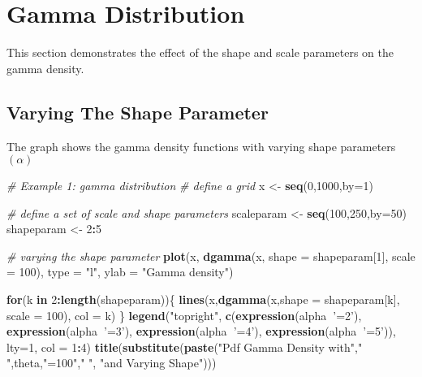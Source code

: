 \documentclass[]{book}
\newenvironment{Shaded}{\begin{snugshade}}{\end{snugshade}}
\newcommand{\KeywordTok}[1]{\textcolor[rgb]{0.13,0.29,0.53}{\textbf{#1}}}
\newcommand{\DataTypeTok}[1]{\textcolor[rgb]{0.13,0.29,0.53}{#1}}
\newcommand{\DecValTok}[1]{\textcolor[rgb]{0.00,0.00,0.81}{#1}}
\newcommand{\StringTok}[1]{\textcolor[rgb]{0.31,0.60,0.02}{#1}}
\newcommand{\CommentTok}[1]{\textcolor[rgb]{0.56,0.35,0.01}{\textit{#1}}}
\newcommand{\ControlFlowTok}[1]{\textcolor[rgb]{0.13,0.29,0.53}{\textbf{#1}}}
\newcommand{\OperatorTok}[1]{\textcolor[rgb]{0.81,0.36,0.00}{\textbf{#1}}}
\newcommand{\NormalTok}[1]{#1}
\theoremstyle{definition}
\theoremstyle{definition}
\theoremstyle{definition}
\theoremstyle{remark}
\begin{document}
\section{Gamma Distribution}\label{gamma-distribution}

This section demonstrates the effect of the shape and scale parameters
on the gamma density.

\subsection{Varying The Shape
Parameter}\label{varying-the-shape-parameter}

The graph shows the gamma density functions with varying shape
parameters \((\alpha)\)

\begin{Shaded}
\begin{Highlighting}[]
\CommentTok{# Example 1: gamma distribution}
\CommentTok{# define a grid}
\NormalTok{x <-}\StringTok{ }\KeywordTok{seq}\NormalTok{(}\DecValTok{0}\NormalTok{,}\DecValTok{1000}\NormalTok{,}\DataTypeTok{by=}\DecValTok{1}\NormalTok{)}

\CommentTok{# define a set of scale and shape parameters}
\NormalTok{scaleparam <-}\StringTok{ }\KeywordTok{seq}\NormalTok{(}\DecValTok{100}\NormalTok{,}\DecValTok{250}\NormalTok{,}\DataTypeTok{by=}\DecValTok{50}\NormalTok{)}
\NormalTok{shapeparam <-}\StringTok{ }\DecValTok{2}\OperatorTok{:}\DecValTok{5}

\CommentTok{# varying the shape parameter}
\KeywordTok{plot}\NormalTok{(x, }\KeywordTok{dgamma}\NormalTok{(x, }\DataTypeTok{shape =}\NormalTok{ shapeparam[}\DecValTok{1}\NormalTok{], }\DataTypeTok{scale =} \DecValTok{100}\NormalTok{), }\DataTypeTok{type =} \StringTok{"l"}\NormalTok{, }\DataTypeTok{ylab =} \StringTok{"Gamma density"}\NormalTok{)}

\ControlFlowTok{for}\NormalTok{(k }\ControlFlowTok{in} \DecValTok{2}\OperatorTok{:}\KeywordTok{length}\NormalTok{(shapeparam))\{}
  \KeywordTok{lines}\NormalTok{(x,}\KeywordTok{dgamma}\NormalTok{(x,}\DataTypeTok{shape =}\NormalTok{ shapeparam[k], }\DataTypeTok{scale =} \DecValTok{100}\NormalTok{), }\DataTypeTok{col =}\NormalTok{ k)}
\NormalTok{\}}
\KeywordTok{legend}\NormalTok{(}\StringTok{"topright"}\NormalTok{, }\KeywordTok{c}\NormalTok{(}\KeywordTok{expression}\NormalTok{(alpha}\OperatorTok{~}\StringTok{'=2'}\NormalTok{), }\KeywordTok{expression}\NormalTok{(alpha}\OperatorTok{~}\StringTok{'=3'}\NormalTok{), }\KeywordTok{expression}\NormalTok{(alpha}\OperatorTok{~}\StringTok{'=4'}\NormalTok{), }\KeywordTok{expression}\NormalTok{(alpha}\OperatorTok{~}\StringTok{'=5'}\NormalTok{)), }\DataTypeTok{lty=}\DecValTok{1}\NormalTok{, }\DataTypeTok{col =} \DecValTok{1}\OperatorTok{:}\DecValTok{4}\NormalTok{)}
\KeywordTok{title}\NormalTok{(}\KeywordTok{substitute}\NormalTok{(}\KeywordTok{paste}\NormalTok{(}\StringTok{"Pdf Gamma Density with"}\NormalTok{,}\StringTok{" "}\NormalTok{,theta,}\StringTok{"=100"}\NormalTok{,}\StringTok{" "}\NormalTok{, }\StringTok{"and Varying Shape"}\NormalTok{)))}
\end{Highlighting}
\end{Shaded}
\end{document}
